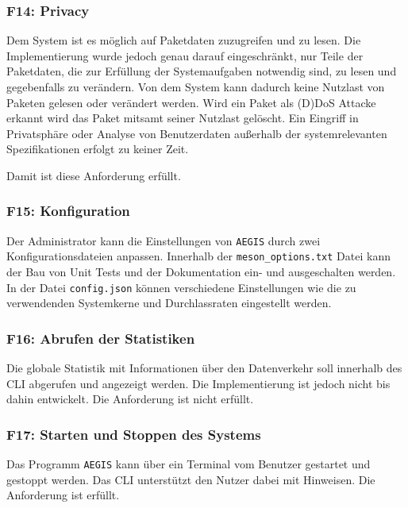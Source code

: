 \documentclass[../review_3.tex]{subfiles}
\begin{document}
\subsubsection{F14: Privacy}
Dem System ist es möglich auf Paketdaten zuzugreifen und zu lesen. Die Implementierung wurde jedoch genau darauf eingeschränkt, nur Teile der Paketdaten, die zur Erfüllung der Systemaufgaben notwendig sind, zu lesen und gegebenfalls zu verändern. Von dem System kann dadurch keine Nutzlast von Paketen gelesen oder verändert werden. Wird ein Paket als (D)DoS Attacke erkannt wird das Paket mitsamt seiner Nutzlast gelöscht. Ein Eingriff in Privatsphäre oder Analyse von Benutzerdaten außerhalb der systemrelevanten Spezifikationen erfolgt zu keiner Zeit. 

Damit ist diese Anforderung erfüllt.

\subsubsection{F15: Konfiguration}
Der Administrator kann die Einstellungen von \texttt{AEGIS} durch zwei Konfigurationsdateien anpassen. Innerhalb der \texttt{meson\_options.txt} Datei kann der Bau von Unit Tests und der Dokumentation ein- und ausgeschalten werden. In der Datei \texttt{config.json} können verschiedene Einstellungen wie die zu verwendenden Systemkerne und Durchlassraten eingestellt werden. 

\subsubsection{F16: Abrufen der Statistiken}
Die globale Statistik mit Informationen über den Datenverkehr soll innerhalb des CLI abgerufen und angezeigt werden. Die Implementierung ist jedoch nicht bis dahin entwickelt. Die Anforderung ist nicht erfüllt.

\subsubsection{F17: Starten und Stoppen des Systems}
Das Programm \texttt{AEGIS} kann über ein Terminal vom Benutzer gestartet und gestoppt werden. Das CLI unterstützt den Nutzer dabei mit Hinweisen. Die Anforderung ist erfüllt.
\end{document}
